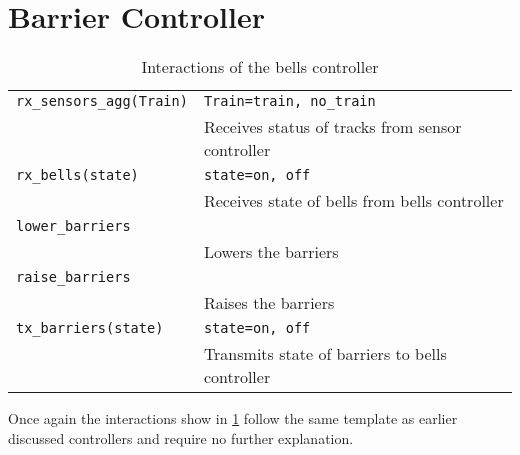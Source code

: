 \documentclass[final]{report}
\begin{document}
\section{Barrier Controller}
\begin{table}[H]
\centering
    \begin{tabular}{|l|l|}
    \hline
    \texttt{rx\_sensors\_agg(Train)} & \texttt{Train=train, no\_train}                  \\
                                     & Receives status of tracks from sensor controller \\
    \texttt{rx\_bells(state)}        & \texttt{state=on, off}                           \\
                                     & Receives state of bells from bells controller    \\ \hline
    \texttt{lower\_barriers}         &                                                  \\
                                     & Lowers the barriers                              \\
    \texttt{raise\_barriers}         &                                                  \\
                                     & Raises the barriers                              \\
    \texttt{tx\_barriers(state)}     & \texttt{state=on, off}                           \\
                                     & Transmits state of barriers to bells controller  \\ \hline
    \end{tabular}
\caption{Interactions of the bells controller}
\label{tab:barriersSignals}
\end{table}

Once again the interactions show in \cref{tab:barriersSignals} follow the same template as earlier discussed controllers and require no further explanation.
\end{document}
